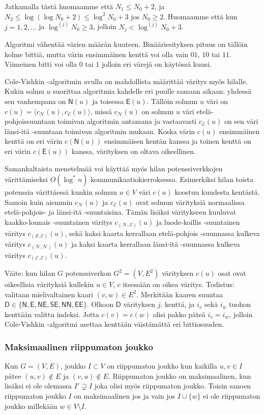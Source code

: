 \documentclass[12pt,finnish]{tktltiki2}
\theoremstyle{definition}
\theoremstyle{remark}
\begin{document}
Jatkamalla tästä huomaamme että $N_1 \leq N_0 + 2$, ja $N_2 \leq \log (\log N_0 + 2) \leq \log^2 N_0 + 3$ jos $N_0 \geq 2$. Huomaamme että kun $j = 1, 2, \ldots$ ja $\log^{(j)} N_0 \geq 3$, jolloin $N_j < \log^{(j)} N_0 + 3$.

Algoritmi vähentää värien määrän kuuteen. Binääriesityksen pituus on tällöin kolme bittiä, mutta värin ensimmäinen kenttä voi olla vain $01$, $10$ tai $11$. Viimeinen bitti voi olla $0$ tai $1$ jolloin eri värejä on käytössä kuusi.

Cole-Vishkin -algoritmin avulla on mahdollista määrittää väritys myös hilalle. Kukin solmu $u$ suorittaa algoritmia kahdelle eri puulle samaan aikaan: yhdessä sen vanhempana on $\mathsf{N}(u)$ ja toisessa $\mathsf{E}(u)$. Tällöin solmun $u$ väri on $c(u) = \langle c_\mathcal{N}(u), c_\mathcal{E}(u) \rangle$, missä $c_\mathcal{N}(u)$ on solmun $u$ väri etelä-pohjoissuuntaan toimivan algoritmin antamana ja vastaavasti $c_\mathcal{E}(u)$ on sen väri länsi-itä -suuntaan toimivan algoritmin mukaan. Koska värin $c(u)$ ensimmäinen kenttä on eri värin $c(\mathsf{N}(u))$ ensimmäisen kentän kanssa ja toinen kenttä on eri värin $c(\mathsf{E}(u))$ kanssa, värityksen on oltava oikeellinen.

Samankaltaista menetelmää voi käyttää myös hilan potenssiverkkojen värittämiseksi $O(\log^* n)$ kommunikaatiokierroksessa. Esimerkiksi hilan toista potenssia värittäessä kunkin solmun $u \in V$ väri $c(u)$ koostuu kuudesta kentästä. Samoin kuin aiemmin $c_\mathcal{N}(u)$ ja $c_\mathcal{E}(u)$ ovat solmun värityksiä normaalissa etelä-pohjois- ja länsi-itä -suuntaisina. Tämän lisäksi väritykseen kuuluvat kaakko-lounais -suuntainen väritys $c_\mathcal{(N,E)}(u)$ ja luode-koillis -suuntainen väritys $c_\mathcal{(S,E)}(u)$, sekä kaksi kaarta kerrallaan etelä-pohjois -suunnassa kulkeva väritys $c_\mathcal{(N,N)}(u)$ ja kaksi kaarta kerrallaan länsi-itä -suunnassa kulkeva väritys $c_\mathcal{(E,E)}(u)$.

Väite: kun hilan $G$ potenssiverkon $G^2 = (V, E^2)$ värityksen $c(u)$ osat ovat oikeellisia värityksiä kullekin $u \in V$, $c$ itsessään on oikea väritys. Todistus: valitaan mielivaltainen kaari $(v, w) \in E^2$. Merkitään kaaren suuntaa $\mathsf{D} \in \{  \mathsf{N, E, NE, SE, NN, EE}\}$. Olkoon $\mathsf{D}$ värityksen $j.$ kenttä, ja $i_v$ sekä $i_w$ tuohon kenttään valittu indeksi. Jotta $c(v) = c(w)$ olisi pakko päteä $i_v = i_w$, jolloin Cole-Vishkin -algoritmi asettaa kenttään väistämättä eri bittiosuuden.

\subsubsection{Maksimaalinen riippumaton joukko}
Kun $G = (V, E)$, joukko $I \subset V$ on riippumaton joukko kun kaikilla $u, v \in I$ pätee $(u, v) \notin E$ ja $(v, u) \notin E$. Riippumaton joukko on maksimaalinen, kun lisäksi ei ole olemassa $I' \supsetneq I$ joka olisi myös riippumaton joukko. Toisin sanoen riippumaton joukko $I$ on maksimaalinen jos ja vain jos $I \cup \{w\}$ ei ole riippumaton joukko millekään $w \in V \setminus I$.
\end{document}
